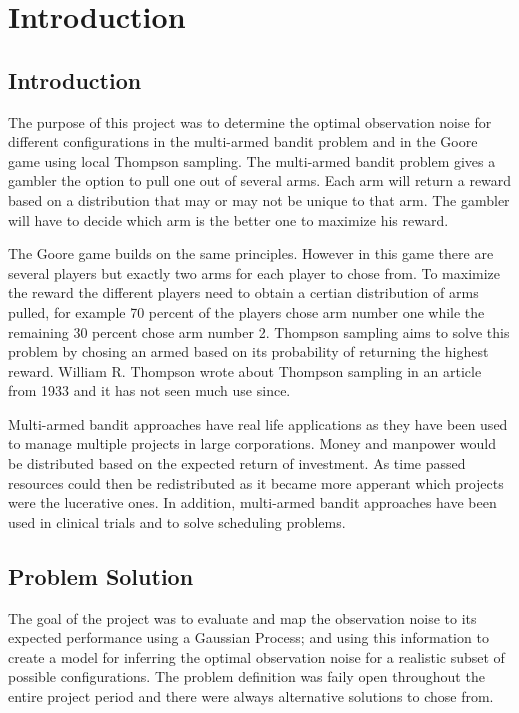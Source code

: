 \chapter{Introduction}
\label{ch:introduction}

\section{Introduction}
The purpose of this project was to determine the optimal observation noise for different 
configurations in the multi-armed bandit problem and in the Goore game using local
Thompson sampling. The multi-armed bandit problem gives a gambler the option to pull one
out of several arms. Each arm will return a reward based on a distribution that may or may not be
unique to that arm. The gambler will have to decide which arm is the better one to maximize his
reward.

The Goore game builds on the same principles. However in this game there are several players
but exactly two arms for each player to chose from. To maximize the reward the different
players need to obtain a certian distribution of arms pulled, for example 70 percent of the players chose
arm number one while the remaining 30 percent chose arm number 2. Thompson sampling aims to solve
this problem by chosing an armed based on its probability of returning the highest reward. William R.
Thompson wrote about Thompson sampling in an article from 1933 and it has not seen much use since.

Multi-armed bandit approaches have real life applications as they have been used to manage multiple
projects in large corporations. Money and manpower would be distributed based on the expected
return of investment. As time passed resources could then be redistributed as it became more apperant
which projects were the lucerative ones. In addition, multi-armed bandit approaches have been used
in clinical trials and to solve scheduling problems.

\section{Problem Solution}
The goal of the project was to evaluate and map the observation noise to its expected performance using
a Gaussian Process; and using this information to create a model for inferring the optimal observation noise 
for a realistic subset of possible configurations. The problem definition was faily open throughout the entire
project period and there were always alternative solutions to chose from. 


